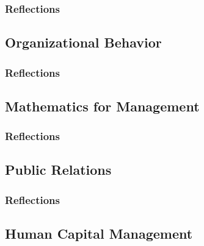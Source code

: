 \documentclass[12pt,titlepage]{article}
\begin{document}
\subsubsection{Reflections}

\subsection{Organizational Behavior}
\subsubsection{Reflections}




\subsection{Mathematics for Management}
\subsubsection{Reflections}




\subsection{Public Relations}
\subsubsection{Reflections}


\subsection{Human Capital Management}
\end{document}
